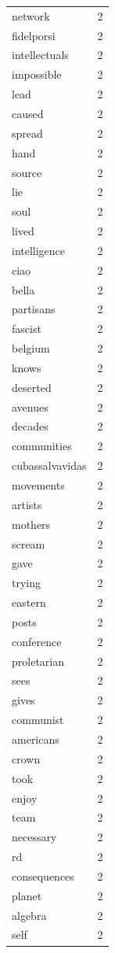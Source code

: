 \begin{tabular}{lr}
network & 2 \\
fidelporsi & 2 \\
intellectuals & 2 \\
impossible & 2 \\
lead & 2 \\
caused & 2 \\
spread & 2 \\
hand & 2 \\
source & 2 \\
lie & 2 \\
soul & 2 \\
lived & 2 \\
intelligence & 2 \\
ciao & 2 \\
bella & 2 \\
partisans & 2 \\
fascist & 2 \\
belgium & 2 \\
knows & 2 \\
deserted & 2 \\
avenues & 2 \\
decades & 2 \\
communities & 2 \\
cubassalvavidas & 2 \\
movements & 2 \\
artists & 2 \\
mothers & 2 \\
scream & 2 \\
gave & 2 \\
trying & 2 \\
eastern & 2 \\
posts & 2 \\
conference & 2 \\
proletarian & 2 \\
sees & 2 \\
gives & 2 \\
communist & 2 \\
americans & 2 \\
crown & 2 \\
took & 2 \\
enjoy & 2 \\
team & 2 \\
necessary & 2 \\
rd & 2 \\
consequences & 2 \\
planet & 2 \\
algebra & 2 \\
self & 2 \\

\end{tabular}
